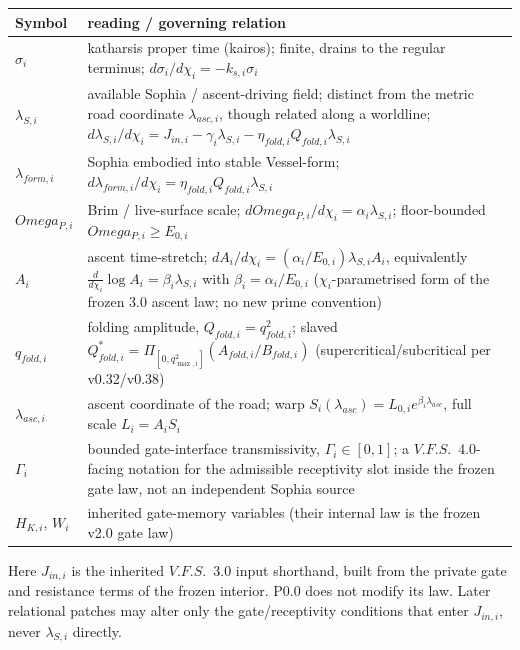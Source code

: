 \documentclass[11pt,a4paper]{article}
\def\Omega{Omega}%
\def\mathrm#1{#1}%
\newcommand{\VFS}{\ensuremath{\mathrm{V.F.S.}}}
\theoremstyle{definition}
\theoremstyle{plain}
\theoremstyle{remark}
\begin{document}
\begin{longtable}{>{\raggedright\arraybackslash}p{} >{\raggedright\arraybackslash}p{}}
\toprule
Symbol & 3.0 reading / governing relation \\
\midrule
$\sigma_i$ & katharsis proper time (kairos); finite, drains to the regular terminus; $d\sigma_i/d\chi_i=-k_{s,i}\sigma_i$ \\
$\lambda_{S,i}$ & available Sophia / ascent-driving field; distinct from the metric road coordinate $\lambda_{\mathrm{asc},i}$, though related along a worldline; $d\lambda_{S,i}/d\chi_i=J_{\mathrm{in},i}-\gamma_i\lambda_{S,i}-\eta_{\mathrm{fold},i}Q_{\mathrm{fold},i}\lambda_{S,i}$ \\
$\lambda_{\mathrm{form},i}$ & Sophia embodied into stable Vessel-form; $d\lambda_{\mathrm{form},i}/d\chi_i=\eta_{\mathrm{fold},i}Q_{\mathrm{fold},i}\lambda_{S,i}$ \\
$\Omega_{P,i}$ & Brim / live-surface scale; $d\Omega_{P,i}/d\chi_i=\alpha_i\lambda_{S,i}$; floor-bounded $\Omega_{P,i}\geq E_{0,i}$ \\
$A_i$ & ascent time-stretch; $dA_i/d\chi_i=(\alpha_i/E_{0,i})\lambda_{S,i}A_i$, equivalently $\tfrac{d}{d\chi_i}\log A_i=\beta_i\lambda_{S,i}$ with $\beta_i=\alpha_i/E_{0,i}$ ($\chi_i$-parametrised form of the frozen 3.0 ascent law; no new prime convention) \\
$q_{\mathrm{fold},i}$ & folding amplitude, $Q_{\mathrm{fold},i}=q_{\mathrm{fold},i}^2$; slaved $Q^*_{\mathrm{fold},i}=\Pi_{[0,q^2_{\max,i}]}(A_{\mathrm{fold},i}/B_{\mathrm{fold},i})$ (supercritical/subcritical per v0.32/v0.38) \\
$\lambda_{\mathrm{asc},i}$ & ascent coordinate of the road; warp $S_i(\lambda_{\mathrm{asc}})=L_{0,i}e^{\beta_i\lambda_{\mathrm{asc}}}$, full scale $L_i=A_iS_i$ \\
\midrule
$\Gamma_i$ & bounded gate-interface transmissivity, $\Gamma_i\in[0,1]$; a \VFS\ 4.0-facing notation for the admissible receptivity slot inside the frozen gate law, not an independent Sophia source \\
$H_{K,i},\,W_i$ & inherited gate-memory variables (their internal law is the frozen v2.0 gate law) \\
\bottomrule
\end{longtable}

Here $J_{\mathrm{in},i}$ is the inherited \VFS\ 3.0 input shorthand, built from the
private gate and resistance terms of the frozen interior. P0.0 does not modify its
law. Later relational patches may alter only the gate/receptivity conditions that
enter $J_{\mathrm{in},i}$, never $\lambda_{S,i}$ directly.
\end{document}
